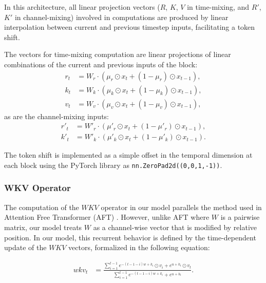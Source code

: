 \documentclass[11pt]{article}
\begin{document}

In this architecture, all linear projection vectors ($R$, $K$, $V$ in time-mixing, and $R'$, $K'$ in channel-mixing) involved in computations are produced by linear interpolation between current and previous timestep inputs, facilitating a token shift.

The vectors for time-mixing computation are linear projections of linear combinations of the current and previous inputs of the block:
\begin{align}
\label{eq:time-mix1}
r_t &= W_r \cdot (\mu_r \odot x_t + (1 - \mu_r) \odot x_{t-1} ), \\
\label{eq:time-mix2}
k_t &= W_k \cdot (\mu_k \odot x_t + (1 - \mu_k) \odot x_{t-1} ), \\
\label{eq:time-mix3}
v_t &= W_v \cdot (\mu_v \odot x_t + (1 - \mu_v) \odot x_{t-1} ),
\end{align}
as are the channel-mixing inputs:
\begin{align}\label{eq:channel_mix_eqs1}
r'_t &= W'_r \cdot (\mu'_r \odot x_t + (1 - \mu'_r) \odot x_{t-1} ), \\
\label{eq:channel_mix_eqs2}
k'_t &= W'_k \cdot (\mu'_k \odot x_t + (1 - \mu'_k) \odot x_{t-1} ).
\end{align}

The token shift is implemented as a simple offset in the temporal dimension at each block using the PyTorch \citep{paszke2019pytorch} library as \texttt{nn.ZeroPad2d((0,0,1,-1))}.

\subsubsection{WKV Operator}

The computation of the $WKV$ operator in our model parallels the method used in Attention Free Transformer (AFT) \cite{zhai2021attention}. However, unlike AFT where $W$ is a pairwise matrix, our model treats $W$ as a channel-wise vector that is modified by relative position. In our model, this recurrent behavior is defined by the time-dependent update of the $WKV$ vectors, formalized in the following equation:

\begin{align}
    \label{eq:nom-denom}
    wkv_t &= \frac{ \sum_{i=1}^{t-1} e^{-(t-1-i)w+k_i} \odot v_i + e^{u+k_t} \odot v_t }{\sum_{i=1}^{t-1} e^{-(t-1-i)w+k_i} + e^{u+k_t}}.
\end{align}
\end{document}

